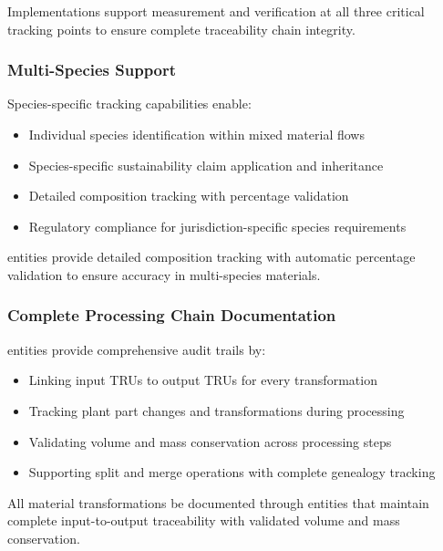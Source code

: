 \begin{normative}[title=Critical Tracking Point Requirements]
Implementations \MUST{} support measurement and verification at all three critical tracking points to ensure complete traceability chain integrity.
\end{normative}

\subsubsection{Multi-Species Support}
\label{sec:multi-species-support}

Species-specific tracking capabilities enable:

\begin{itemize}
    \item Individual species identification within mixed material flows
    \item Species-specific sustainability claim application and inheritance
    \item Detailed composition tracking with percentage validation
    \item Regulatory compliance for jurisdiction-specific species requirements
\end{itemize}

\begin{informative}[title=Species Composition Validation]
 entities provide detailed composition tracking with automatic percentage validation to ensure accuracy in multi-species materials.
\end{informative}

\subsubsection{Complete Processing Chain Documentation}
\label{sec:processing-chain-documentation}

 entities provide comprehensive audit trails by:

\begin{itemize}
    \item Linking input TRUs to output TRUs for every transformation
    \item Tracking plant part changes and transformations during processing
    \item Validating volume and mass conservation across processing steps
    \item Supporting split and merge operations with complete genealogy tracking
\end{itemize}

\begin{normative}[title=Processing Chain Requirements]
All material transformations \MUST{} be documented through  entities that maintain complete input-to-output traceability with validated volume and mass conservation.
\end{normative}